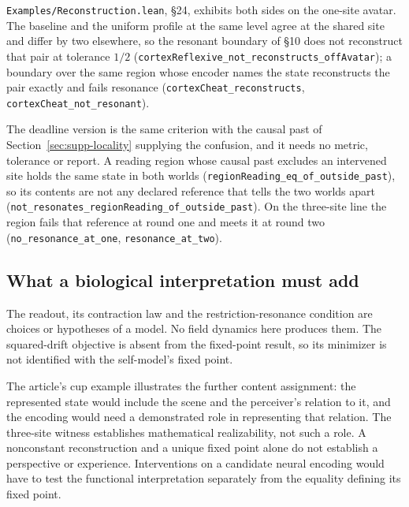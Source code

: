 \documentclass{article}
\begin{document}
\nolinkurl{Examples/Reconstruction.lean}, \S24, exhibits both sides on the one-site
avatar. The baseline and the uniform profile at the same level agree at the
shared site and differ by two elsewhere, so the resonant boundary of \S10 does
not reconstruct that pair at tolerance $1/2$
(\nolinkurl{cortexReflexive_not_reconstructs_offAvatar}); a boundary over the same
region whose encoder names the state reconstructs the pair exactly and fails
resonance (\nolinkurl{cortexCheat_reconstructs}, \nolinkurl{cortexCheat_not_resonant}).

The deadline version is the same criterion with the causal past of
Section~\ref{sec:supp-locality} supplying the confusion, and it needs no
metric, tolerance or report. A reading region whose causal past excludes an
intervened site holds the same state in both worlds
(\nolinkurl{regionReading_eq_of_outside_past}), so its contents are not any declared
reference that tells the two worlds apart
(\nolinkurl{not_resonates_regionReading_of_outside_past}). On the three-site line
the region fails that reference at round one and meets it at round two
(\nolinkurl{no_resonance_at_one}, \nolinkurl{resonance_at_two}).

\subsection{What a biological interpretation must add}

The readout, its contraction law and the restriction-resonance condition are choices or hypotheses of a model. No field dynamics here produces them. The squared-drift objective is absent from the fixed-point result, so its minimizer is not identified with the self-model's fixed point.

The article's cup example illustrates the further content assignment: the represented state would include the scene and the perceiver's relation to it, and the encoding would need a demonstrated role in representing that relation. The three-site witness establishes mathematical realizability, not such a role. A nonconstant reconstruction and a unique fixed point alone do not establish a perspective or experience. Interventions on a candidate neural encoding would have to test the functional interpretation separately from the equality defining its fixed point.
\end{document}

